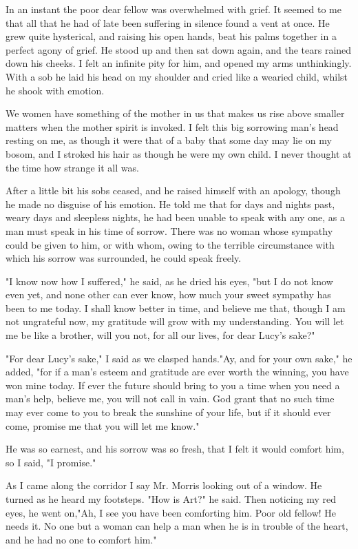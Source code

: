 In an instant the poor dear fellow was overwhelmed with grief. It seemed to me that all that he had of late been suffering in silence found a vent at once. He grew quite hysterical, and raising his open hands, beat his palms together in a perfect agony of grief. He stood up and then sat down again, and the tears rained down his cheeks. I felt an infinite pity for him, and opened my arms unthinkingly. With a sob he laid his head on my shoulder and cried like a wearied child, whilst he shook with emotion. 

We women have something of the mother in us that makes us rise above smaller matters when the mother spirit is invoked. I felt this big sorrowing man's head resting on me, as though it were that of a baby that some day may lie on my bosom, and I stroked his hair as though he were my own child. I never thought at the time how strange it all was. 

After a little bit his sobs ceased, and he raised himself with an apology, though he made no disguise of his emotion. He told me that for days and nights past, weary days and sleepless nights, he had been unable to speak with any one, as a man must speak in his time of sorrow. There was no woman whose sympathy could be given to him, or with whom, owing to the terrible circumstance with which his sorrow was surrounded, he could speak freely. 

"I know now how I suffered," he said, as he dried his eyes, "but I do not know even yet, and none other can ever know, how much your sweet sympathy has been to me today. I shall know better in time, and believe me that, though I am not ungrateful now, my gratitude will grow with my understanding. You will let me be like a brother, will you not, for all our lives, for dear Lucy's sake?" 

"For dear Lucy's sake," I said as we clasped hands."Ay, and for your own sake," he added, "for if a man's esteem and gratitude are ever worth the winning, you have won mine today. If ever the future should bring to you a time when you need a man's help, believe me, you will not call in vain. God grant that no such time may ever come to you to break the sunshine of your life, but if it should ever come, promise me that you will let me know." 

He was so earnest, and his sorrow was so fresh, that I felt it would comfort him, so I said, "I promise." 

As I came along the corridor I say Mr. Morris looking out of a window. He turned as he heard my footsteps. "How is Art?" he said. Then noticing my red eyes, he went on,"Ah, I see you have been comforting him. Poor old fellow! He needs it. No one but a woman can help a man when he is in trouble of the heart, and he had no one to comfort him." 

